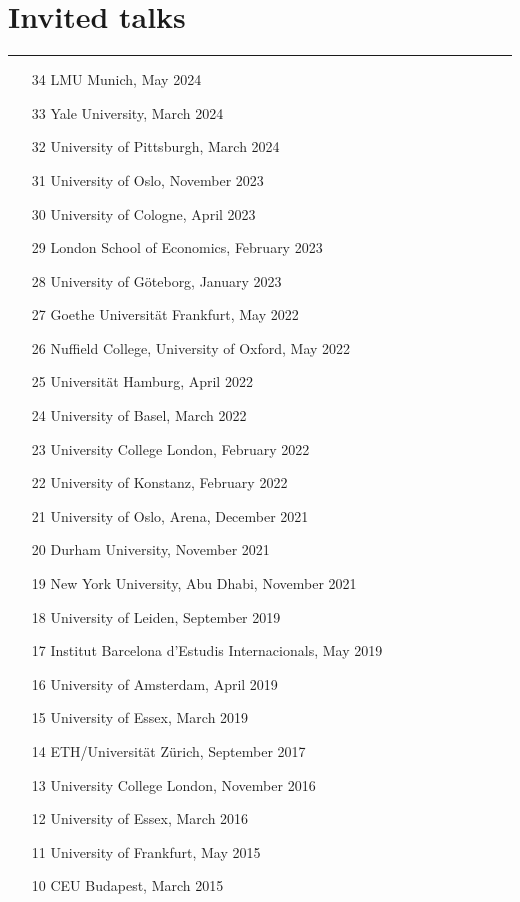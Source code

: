 \section*{Invited talks}\vspace{-2em}\rule{\textwidth}{0.5pt}\vspace{1em}
\begin{enumerate}[topsep=0pt, noitemsep, leftmargin=3\labelsep]
	\item[34] LMU Munich, May 2024
	\item[33] Yale University, March 2024
	\item[32] University of Pittsburgh, March 2024
	\item[31] University of Oslo, November 2023
	\item[30] University of Cologne, April 2023
	\item[29] London School of Economics, February 2023
	\item[28] University of Göteborg, January 2023
	\item[27] Goethe Universität Frankfurt, May 2022
	\item[26] Nuffield College, University of Oxford, May 2022
	\item[25] Universität Hamburg, April 2022
	\item[24] University of Basel, March 2022
	\item[23] University College London, February 2022
	\item[22] University of Konstanz, February 2022
	\item[21] University of Oslo, Arena, December 2021
	\item[20] Durham University, November 2021
	\item[19] New York University, Abu Dhabi, November 2021
	\item[18] University of Leiden, September 2019
	\item[17] Institut Barcelona d'Estudis Internacionals, May 2019
	\item[16] University of Amsterdam, April 2019
	\item[15] University of Essex, March 2019
	\item[14] ETH/Universität Zürich, September 2017
	\item[13] University College London, November 2016
	\item[12] University of Essex, March 2016
	\item[11] University of Frankfurt, May 2015
	\item[10] CEU Budapest, March 2015

\end{enumerate}
